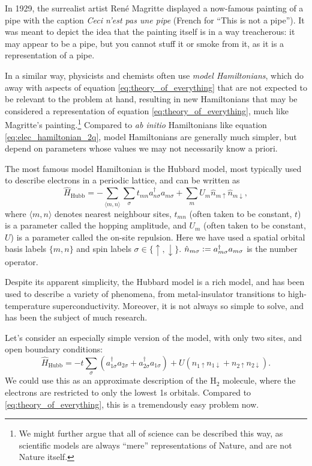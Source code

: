 In 1929, the surrealist artist Ren\'e Magritte displayed a now-famous painting of a pipe with the caption \emph{Ceci n'est pas une pipe} (French for ``This is not a pipe''). It was meant to depict the idea that the painting itself is in a way treacherous: it may appear to be a pipe, but you cannot stuff it or smoke from it, as it is a representation of a pipe.

In a similar way, physicists and chemists often use \emph{model Hamiltonians}, which do away with aspects of equation \eqref{eq:theory_of_everything} that are not expected to be relevant to the problem at hand, resulting in new Hamiltonians that may be considered a representation of equation \eqref{eq:theory_of_everything}, much like Magritte's painting.\footnote{We might further argue that all of science can be described this way, as scientific models are always ``mere'' representations of Nature, and are not Nature itself.} Compared to \emph{ab initio} Hamiltonians like equation \eqref{eq:elec_hamiltonian_2q}, model Hamiltonians are generally much simpler, but depend on parameters whose values we may not necessarily know a priori.

The most famous model Hamiltonian is the Hubbard model,\cite{Hubbard1963} most typically used to describe electrons in a periodic lattice, and can be written as
\begin{equation}
\label{eq:hubbard}
\hat H_\mathrm{Hubb} = - \sum_{\langle m,n\rangle}\sum_\sigma t_{mn} a_{n\sigma}^\dag a_{m\sigma} + \sum_m U_m\hat n_{m\uparrow}\hat n_{m\downarrow},
\end{equation}
where $\langle m,n\rangle$ denotes nearest neighbour sites, $t_{mn}$ (often taken to be constant, $t$) is a parameter called the hopping amplitude, and $U_m$ (often taken to be constant, $U$) is a parameter called the on-site repulsion. Here we have used a spatial orbital basis labels $\{m,n\}$ and spin labels $\sigma\in\{\uparrow,\downarrow\}$. $\hat n_{m\sigma}\mathrel{\mathop:}= a_{m\sigma}^\dag a_{m\sigma}$ is the number operator.

Despite its apparent simplicity, the Hubbard model is a rich model, and has been used to describe a variety of phenomena, from metal-insulator transitions to high-temperature superconductivity. Moreover, it is not always so simple to solve, and has been the subject of much research.\cite{Lieb1968a,liebermannFCIQMC2023}

Let's consider an especially simple version of the model, with only two sites, and open boundary conditions:
\begin{equation}
\label{eq:hubbard_h2}
\hat H_\mathrm{Hubb} = - t\sum_{\sigma}(a_{1\sigma}^\dag a_{2\sigma} + a_{2\sigma}^\dag a_{1\sigma}) + U(n_{1\uparrow}n_{1\downarrow}+n_{2\uparrow}n_{2\downarrow}).
\end{equation}
We could use this as an approximate description of the H$_2$ molecule, where the electrons are restricted to only the lowest 1s orbitals. Compared to \eqref{eq:theory_of_everything}, this is a tremendously easy problem now.

